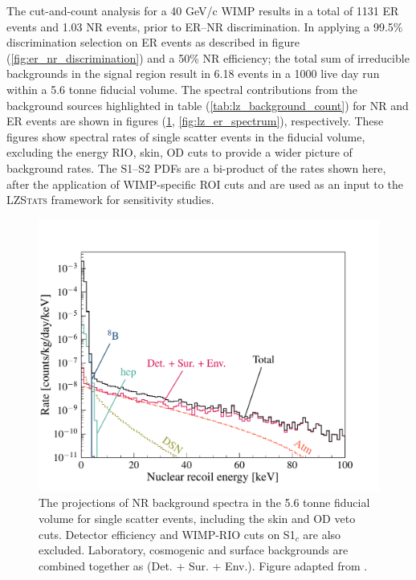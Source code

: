 The cut-and-count analysis for a 40 GeV/c\squared{} WIMP results in a total of 1131 ER events and 1.03 NR events, prior to ER--NR discrimination. In applying a 99.5\% discrimination selection on ER events as described in figure (\ref{fig:er_nr_discrimination}) and a 50\% NR efficiency; the total sum of irreducible backgrounds in the signal region result in 6.18 events in a 1000 live day run within a 5.6 tonne fiducial volume. The spectral contributions from the background sources highlighted in table (\ref{tab:lz_background_count}) for NR and ER events are shown in figures (\ref{fig:lz_nr_spectrum}, \ref{fig:lz_er_spectrum}), respectively. These figures show spectral rates of single scatter events in the fiducial volume, excluding the energy RIO, skin, OD cuts to provide a wider picture of background rates. The S1--S2 PDFs are a bi-product of the rates shown here, after the application of WIMP-specific ROI cuts and are used as an input to the \textsc{LZStats} framework for sensitivity studies.

%
\begin{figure}[h]
    \centering
    \includegraphics[scale=0.5]{Chapter_5/Figures/nr_background_spectrum.pdf}
    \caption[The projections of NR background spectra in the 5.6 tonne fiducial volume for single scatter events, including the skin and OD veto cuts.]%
    {The projections of NR background spectra in the 5.6 tonne fiducial volume for single scatter events, including the skin and OD veto cuts. Detector efficiency and WIMP-RIO cuts on S1$_{c}$ are also excluded. Laboratory, cosmogenic and surface backgrounds are combined together as (Det. + Sur. + Env.). Figure adapted from \cite{akerib2018projected}.}
    \label{fig:lz_nr_spectrum}
\end{figure}
%

